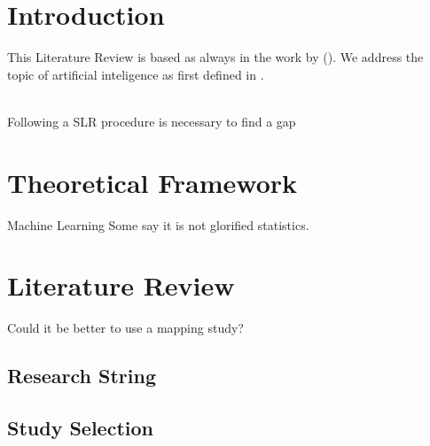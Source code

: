 \section{Introduction}
\normalem
This Literature Review is based as always in the work by \citeauthor{Kitchenham2007} (\citeyear{Kitchenham2007}). We address the topic of artificial inteligence as first defined in \parencite{turing1948intelligent}.

\lipsum[4]\\

Following a SLR procedure is necessary to find a gap \parencite{Kitchenham2007}
\section{Theoretical Framework}

\begin{definition}{Machine Learning}
Some say it is not glorified statistics.
\end{definition}

\section{Literature Review}
Could it be better to use a mapping study?
\subsection{Research String}
\lipsum[5]
\subsection{Study Selection}